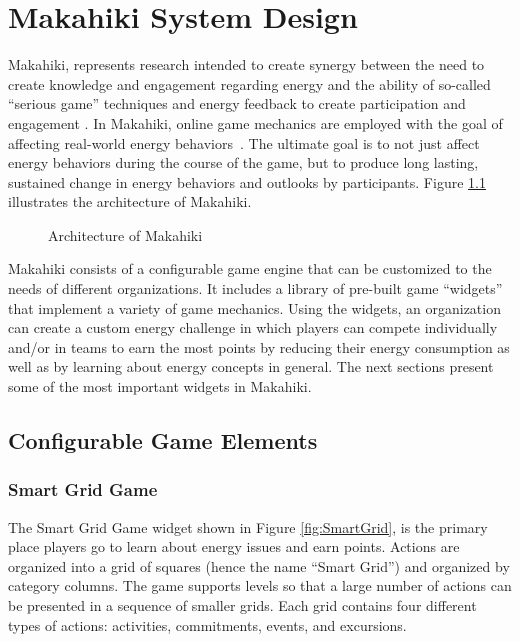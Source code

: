 \chapter{Makahiki System Design}
\label{cha:system-description}

Makahiki, represents research intended to create synergy between the need to create knowledge and engagement regarding energy and the ability of so-called ``serious game'' techniques and energy feedback to create participation and engagement \cite{Deterding2011mt,darby-review-2006,Faruqui09,petersen-dorm-energy-reduction}. In Makahiki, online game mechanics are employed with the goal of affecting real-world energy behaviors~\cite{csdl2-10-07}.  The ultimate goal is to not just affect energy behaviors during the course of the game, but to produce long lasting, sustained change in energy behaviors and outlooks by participants. Figure \ref{fig:makahiki-architecture} illustrates the architecture of Makahiki.

\begin{figure}
\begin{center}
\end{center}
\caption{Architecture of Makahiki}
\label{fig:makahiki-architecture}
\end{figure}

Makahiki consists of a configurable game engine that can be customized to the needs of different organizations.  It includes a library of pre-built game ``widgets'' that implement a variety of game mechanics.  Using the widgets, an organization can create a custom energy challenge in which players can compete individually and/or in teams to earn the most points by reducing their energy consumption as well as by learning about energy concepts in general.  The next sections present some of the most important widgets in Makahiki.

\section{Configurable Game Elements}

\subsection{Smart Grid Game}

The Smart Grid Game widget shown in Figure \ref{fig:SmartGrid}, is the primary place players go to learn about energy issues and earn points. Actions are organized into a grid of squares (hence the name ``Smart Grid'') and organized by category columns. The game supports levels so that a large number of actions can be presented in a sequence of smaller grids. Each grid contains four different types of actions: activities, commitments, events, and excursions.

